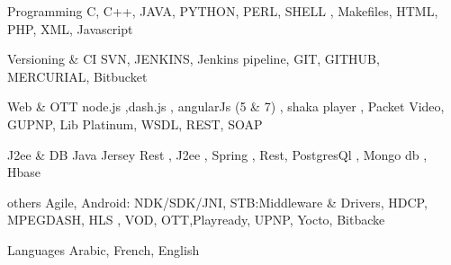 


\begin{cvskills}


\cvskill
{Programming} %
{C, C++, JAVA, PYTHON, PERL, SHELL , Makefiles, HTML, PHP, XML, Javascript  }%

\cvskill
{Versioning \& CI}
{ SVN, JENKINS, Jenkins pipeline, GIT, GITHUB, MERCURIAL, Bitbucket }

\cvskill
{Web \& OTT} %
{node.js ,dash.js , angularJs (5 \& 7) , shaka player ,  Packet Video, GUPNP, Lib Platinum, WSDL, REST, SOAP }%

\cvskill
{J2ee \& DB} %
{Java Jersey Rest , J2ee , Spring , Rest, PostgresQl , Mongo db , Hbase} %

\cvskill
{others}
{ Agile, Android: NDK/SDK/JNI, STB:Middleware \& Drivers, HDCP, MPEGDASH, HLS , VOD, OTT,Playready, UPNP, Yocto, Bitbacke}

\cvskill
{Languages} %
{Arabic, French, English} %


\end{cvskills}
